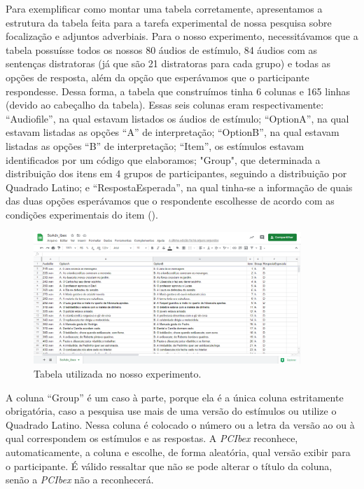 \documentclass{textolivre}
\begin{document}
Para exemplificar como montar uma tabela corretamente, apresentamos a estrutura da tabela feita para a tarefa experimental de nossa pesquisa sobre focalização e adjuntos adverbiais. Para o nosso experimento, necessitávamos que a tabela possuísse todos os nossos 80 áudios de estímulo, 84 áudios com as sentenças distratoras (já que são 21 distratoras para cada grupo) e todas as opções de resposta, além da opção que esperávamos que o participante respondesse. Dessa forma, a tabela que construímos tinha 6 colunas e 165 linhas (devido ao cabeçalho da tabela). Essas seis colunas eram respectivamente: “Audiofile”, na qual estavam listados os áudios de estímulo; “OptionA”, na qual estavam listadas as opções “A” de interpretação; “OptionB”, na qual estavam listadas as opções “B” de interpretação; “Item”, os estímulos estavam identificados por um código que elaboramos; "Group", que determinada a distribuição dos itens em 4 grupos de participantes, seguindo a distribuição por Quadrado Latino; e “RespostaEsperada”, na qual tinha-se a informação de quais das duas opções esperávamos que o respondente escolhesse de acordo com as condições experimentais do item ().

\begin{figure}[htbp]
 \centering
 \includegraphics[width=0.9\textwidth]{fig-011.png}
 \caption{Tabela utilizada no nosso experimento.}
 \label{fig11}
\end{figure}

A coluna “Group” é um caso à parte, porque ela é a única coluna estritamente obrigatória, caso a pesquisa use mais de uma versão do estímulos ou utilize o Quadrado Latino. Nessa coluna é colocado o número ou a letra da versão ao ou à qual correspondem os estímulos e as respostas. A \emph{PCIbex} reconhece, automaticamente, a coluna e escolhe, de forma aleatória, qual versão exibir para o participante. É válido ressaltar que não se pode alterar o título da coluna, senão a \emph{PCIbex} não a reconhecerá.
\end{document}

